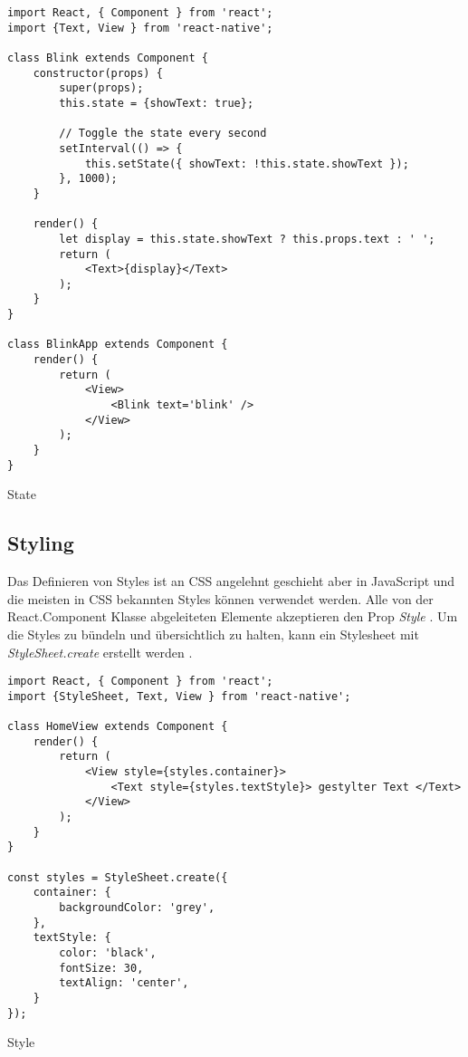 \begin{listing}[H]
    \begin{verbatim}
import React, { Component } from 'react';
import {Text, View } from 'react-native';

class Blink extends Component {
    constructor(props) {
        super(props);
        this.state = {showText: true};

        // Toggle the state every second
        setInterval(() => {
            this.setState({ showText: !this.state.showText });
        }, 1000);
    }

    render() {
        let display = this.state.showText ? this.props.text : ' ';
        return (
            <Text>{display}</Text>
        );
    }
}

class BlinkApp extends Component {
    render() {
        return (
            <View>
                <Blink text='blink' />
            </View>
        );
    }
}

    \end{verbatim}
    \caption{State \cite{facebook_inc._state_2017}}
    \label{lst:state}
\end{listing}


\subsection{Styling}
Das Definieren von Styles ist an CSS angelehnt geschieht aber in JavaScript und die meisten in CSS bekannten Styles können verwendet werden. Alle von der React.Component Klasse abgeleiteten Elemente akzeptieren den Prop \textit{Style} \cite{facebook_inc._style_2017}. Um die Styles zu bündeln und übersichtlich zu halten, kann ein Stylesheet mit \textit{StyleSheet.create} erstellt werden \cite{facebook_inc._style_2017}. 

\begin{listing}[H]
    \begin{verbatim}
import React, { Component } from 'react';
import {StyleSheet, Text, View } from 'react-native';

class HomeView extends Component {
    render() {
        return (
            <View style={styles.container}>
                <Text style={styles.textStyle}> gestylter Text </Text>
            </View>
        );
    }
}

const styles = StyleSheet.create({
    container: {
        backgroundColor: 'grey',
    },
    textStyle: {
        color: 'black',
        fontSize: 30,
        textAlign: 'center',
    }
});    
    \end{verbatim}
    \caption{Style}
    \label{lst:style}
\end{listing}

